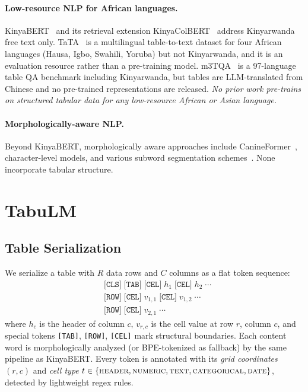 \documentclass[11pt]{article}
\begin{document}
\paragraph{Low-resource NLP for African languages.}
KinyaBERT~\citep{nzeyimana-niyongabo-rubungo-2022-kinyabert} and its retrieval extension KinyaColBERT~\citep{nzeyimana-2023-kinyacolbert} address Kinyarwanda free text only.
TaTA~\citep{gehrmann-etal-2023-tata} is a multilingual table-to-text dataset for four African languages (Hausa, Igbo, Swahili, Yoruba) but not Kinyarwanda, and it is an evaluation resource rather than a pre-training model.
m3TQA~\citep{anonymous-2025-m3tqa} is a 97-language table QA benchmark including Kinyarwanda, but tables are LLM-translated from Chinese and no pre-trained representations are released.
\emph{No prior work pre-trains on structured tabular data for any low-resource African or Asian language.}

\paragraph{Morphologically-aware NLP.}
Beyond KinyaBERT, morphologically aware approaches include CanineFormer~\citep{clark-etal-2022-canine}, character-level models, and various subword segmentation schemes~\citep{rust-etal-2021-good}.
None incorporate tabular structure.

\section{TabuLM}
\label{sec:model}

\subsection{Table Serialization}
\label{sec:serialization}

We serialize a table with $R$ data rows and $C$ columns as a flat token sequence:
\begin{align*}
&\texttt{[CLS]}\;\texttt{[TAB]}\;\texttt{[CEL]}\;h_1\;\texttt{[CEL]}\;h_2\;\cdots \\
&\texttt{[ROW]}\;\texttt{[CEL]}\;v_{1,1}\;\texttt{[CEL]}\;v_{1,2}\;\cdots \\
&\texttt{[ROW]}\;\texttt{[CEL]}\;v_{2,1}\;\cdots
\end{align*}
where $h_c$ is the header of column $c$, $v_{r,c}$ is the cell value at row $r$, column $c$, and special tokens \texttt{[TAB]}, \texttt{[ROW]}, \texttt{[CEL]} mark structural boundaries.
Each content word is morphologically analyzed (or BPE-tokenized as fallback) by the same pipeline as KinyaBERT.
Every token is annotated with its \emph{grid coordinates} $(r, c)$ and \emph{cell type} $t \in \{\textsc{header}, \textsc{numeric}, \textsc{text}, \textsc{categorical}, \textsc{date}\}$, detected by lightweight regex rules.
\end{document}
